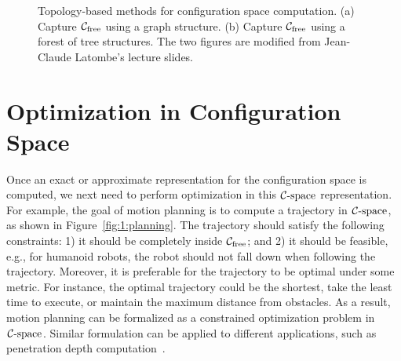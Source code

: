\begin{figure}[!htb]
  \centering
  \caption[Topology-based methods for configuration space computation]{Topology-based methods for configuration space computation. (a) Capture $\mathcal C_{\text{free}}$ using a graph structure. (b) Capture $\mathcal C_{\text{free}}$ using a forest of tree structures. The two figures are modified from Jean-Claude Latombe's lecture slides.}\label{fig:1:topologycspace}
\end{figure}




\section{Optimization in Configuration Space}
\label{sec:1:optimization}
Once an exact or approximate representation for the configuration space is computed, we next need to perform optimization in this $\mathcal C\text{-space}$ representation. For example, the goal of motion planning is to compute a trajectory in $\mathcal C\text{-space}$, as shown in Figure~\ref{fig:1:planning}. The trajectory should satisfy the following constraints: 1) it should be completely inside $\mathcal C_{\text{free}}$; and 2) it should be feasible, e.g., for humanoid robots, the robot should not fall down when following the trajectory. Moreover, 
it is preferable for the trajectory to be optimal under some metric. For instance, the optimal trajectory could be the shortest, take the least time to execute, or maintain the maximum distance from obstacles.
As a result, motion planning can be formalized as a constrained optimization problem in $\mathcal C\text{-space}$. Similar formulation can be applied to different applications, such as penetration depth computation~\cite{Zhang:2007:GPD,Zhang:2007:AFP,Zhang:2008:ICRA,Je:2012:PRP}.


